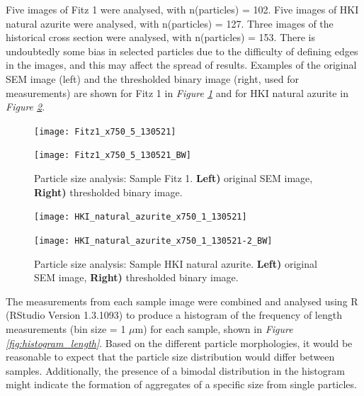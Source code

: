 Five images of Fitz 1 were analysed, with n(particles) = 102. Five images of HKI natural azurite were analysed, with n(particles) = 127. Three images of the historical cross section were analysed, with n(particles) = 153. There is undoubtedly some bias in selected particles due to the difficulty of defining edges in the images, and this may affect the spread of results. Examples of the original SEM image (left) and the thresholded binary image (right, used for measurements) are shown for Fitz 1 in \textit{Figure \ref{fig:imageJ_fitz1}} and for HKI natural azurite in \textit{Figure \ref{fig:imageJ_hki}}. 

\begin{figure}[H]
\centering
\begin{minipage}{.45\textwidth}
  \centering
  \texttt{[image: Fitz1\_x750\_5\_130521]}
\end{minipage}
\begin{minipage}{.45\textwidth}
  \centering
  \texttt{[image: Fitz1\_x750\_5\_130521\_BW]}
\end{minipage}
\caption[Particle size analysis: Sample Fitz 1]{Particle size analysis: Sample Fitz 1. \textbf{Left)} original SEM image, \textbf{Right)} thresholded binary image.}
\label{fig:imageJ_fitz1}
\end{figure}

\begin{figure}[H]
\centering
\begin{minipage}{.45\textwidth}
  \centering
  \texttt{[image: HKI\_natural\_azurite\_x750\_1\_130521]}
\end{minipage}
\begin{minipage}{.45\textwidth}
  \centering
  \texttt{[image: HKI\_natural\_azurite\_x750\_1\_130521-2\_BW]}
\end{minipage}
\caption[Particle size analysis: Sample HKI natural azurite]{Particle size analysis: Sample HKI natural azurite. \textbf{Left)} original SEM image, \textbf{Right)} thresholded binary image.}
\label{fig:imageJ_hki}
\end{figure}

The measurements from each sample image were combined and analysed using R (RStudio Version 1.3.1093) to produce a histogram of the frequency of length measurements (bin size = 1 $\mu$m) for each sample, shown in \textit{Figure \ref{fig:histogram_length}}. Based on the different particle morphologies, it would be reasonable to expect that the particle size distribution would differ between samples. Additionally, the presence of a bimodal distribution in the histogram might indicate the formation of aggregates of a specific size from single particles. 

